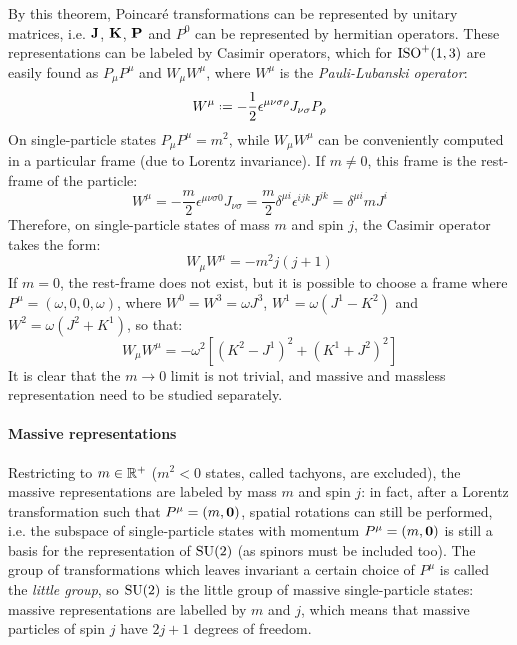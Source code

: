 By this theorem, Poincaré transformations can be represented by unitary matrices, i.e. $ \mathbf{J} $, $ \mathbf{K} $, $ \mathbf{P} $ and $ P^0 $ can be represented by hermitian operators. These representations can be labeled by Casimir operators, which for $ \mathrm{ISO}^+(1,3) $ are easily found as $ P_\mu P^\mu $ and $ W_\mu W^\mu $, where $ W^\mu $ is the \textit{Pauli-Lubanski operator}:
\begin{equation}
  W^\mu \defeq -\frac{1}{2} \epsilon^{\mu \nu \sigma \rho} J_{\nu \sigma} P_\rho
  \label{eq:1.52}
\end{equation}
On single-particle states $ P_\mu P^\mu = m^2 $, while $ W_\mu W^\mu $ can be conveniently computed in a particular frame (due to Lorentz invariance). If $ m \neq 0 $, this frame is the rest-frame of the particle:
\begin{equation*}
  W^\mu = - \frac{m}{2} \epsilon^{\mu \nu \sigma 0} J_{\nu \sigma} = \frac{m}{2} \delta^{\mu i} \epsilon^{ijk} J^{jk} = \delta^{\mu i} m J^i
\end{equation*}
Therefore, on single-particle states of mass $ m $ and spin $ j $, the Casimir operator takes the form:
\begin{equation}
  W_\mu W^\mu = - m^2 j \left( j + 1 \right)
  \label{eq:1.53}
\end{equation}
If $ m = 0 $, the rest-frame does not exist, but it is possible to choose a frame where $ P^\mu = (\omega,0,0,\omega) $, where $ W^0 = W^3 = \omega J^3 $, $ W^1 = \omega \left( J^1 - K^2 \right) $ and $ W^2 = \omega \left( J^2 + K^1 \right) $, so that:
\begin{equation}
  W_\mu W^\mu = - \omega^2 \left[ \left( K^2 - J^1 \right)^2 + \left( K^1 + J^2 \right)^2 \right]
  \label{eq:1.54}
\end{equation}
It is clear that the $ m \rightarrow 0 $ limit is not trivial, and massive and massless representation need to be studied separately.

\paragraph{Massive representations}

Restricting to $ m \in \mathbb{R}^+ $ ($ m^2 < 0 $ states, called tachyons, are excluded), the massive representations are labeled by mass $ m $ and spin $ j $: in fact, after a Lorentz transformation such that $ P^\mu = (m,\mathbf{0}) $, spatial rotations can still be performed, i.e. the subspace of single-particle states with momentum $ P^\mu = (m,\mathbf{0}) $ is still a basis for the representation of $ \mathrm{SU}(2) $ (as spinors must be included too). The group of transformations which leaves invariant a certain choice of $ P^\mu $ is called the \textit{little group}, so $ \mathrm{SU}(2) $ is the little group of massive single-particle states: massive representations are labelled by $ m $ and $ j $, which means that massive particles of spin $ j $ have $ 2j + 1 $ degrees of freedom.

